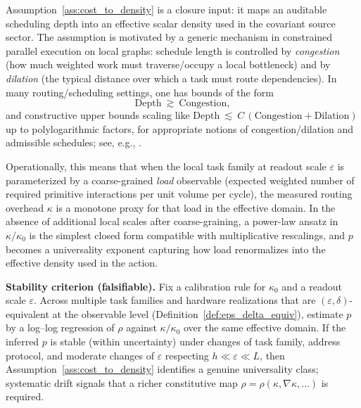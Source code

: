 \begin{remark}
\label{rem:cost_to_density_motivation}
Assumption~\ref{ass:cost_to_density} is a closure input: it maps an auditable scheduling depth into an effective scalar density used in the covariant source sector.
The assumption is motivated by a generic mechanism in constrained parallel execution on local graphs: schedule length is controlled by \emph{congestion} (how much weighted work must traverse/occupy a local bottleneck) and by \emph{dilation} (the typical distance over which a task must route dependencies).
In many routing/scheduling settings, one has bounds of the form
\begin{equation}
  \mathrm{Depth}\ \gtrsim\ \mathrm{Congestion},
\end{equation}
and constructive upper bounds scaling like $\mathrm{Depth}\ \lesssim\ C\,(\mathrm{Congestion}+\mathrm{Dilation})$ up to polylogarithmic factors, for appropriate notions of congestion/dilation and admissible schedules; see, e.g., \cite{LeightonMaggsRao1994,Leighton1992}.
\par
\noindent Operationally, this means that when the local task family at readout scale $\varepsilon$ is parameterized by a coarse-grained \emph{load} observable (expected weighted number of required primitive interactions per unit volume per cycle), the measured routing overhead $\kappa$ is a monotone proxy for that load in the effective domain.
In the absence of additional local scales after coarse-graining, a power-law ansatz in $\kappa/\kappa_0$ is the simplest closed form compatible with multiplicative rescalings, and $p$ becomes a universality exponent capturing how load renormalizes into the effective density used in the action.
\par
\noindent\textbf{Stability criterion (falsifiable).}
Fix a calibration rule for $\kappa_0$ and a readout scale $\varepsilon$.
Across multiple task families and hardware realizations that are $(\varepsilon,\delta)$-equivalent at the observable level (Definition~\ref{def:eps_delta_equiv}), estimate $p$ by a log--log regression of $\rho$ against $\kappa/\kappa_0$ over the same effective domain.
If the inferred $p$ is stable (within uncertainty) under changes of task family, address protocol, and moderate changes of $\varepsilon$ respecting $h\ll\varepsilon\ll L$, then Assumption~\ref{ass:cost_to_density} identifies a genuine universality class; systematic drift signals that a richer constitutive map $\rho=\rho(\kappa,\nabla\kappa,\ldots)$ is required.
\end{remark}

